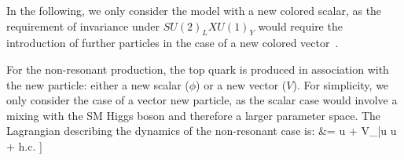 % 
In the following, we only consider the model with a new colored scalar, as the requirement of invariance
under $SU(2)_L X U(1)_Y$ would require the introduction of further particles in the case of a new colored vector~\cite{Boucheneb:2014wza}.

\label{sec:NonResonantProd}

For the non-resonant production, the top quark is produced in association with the new particle:
either a new scalar ($\phi$) or a new vector ($V$). For simplicity, we only consider the case of a vector new particle, as the scalar case would involve a mixing with the SM Higgs boson and therefore a larger parameter space. The Lagrangian describing the dynamics of the non-resonant case is: 
\be\label{eq:lagrangianNonResonantVector}\bsp
\lag &=
\bigg[
\phi \bar u \Big[a^0_{FC}\!+\!b^0_{FC} \gamma_5 \Big] u \!+\!
V_\mu \bar u \gmu {} u  
%
+ \rm h.c. 
\bigg] 
\esp\ee

